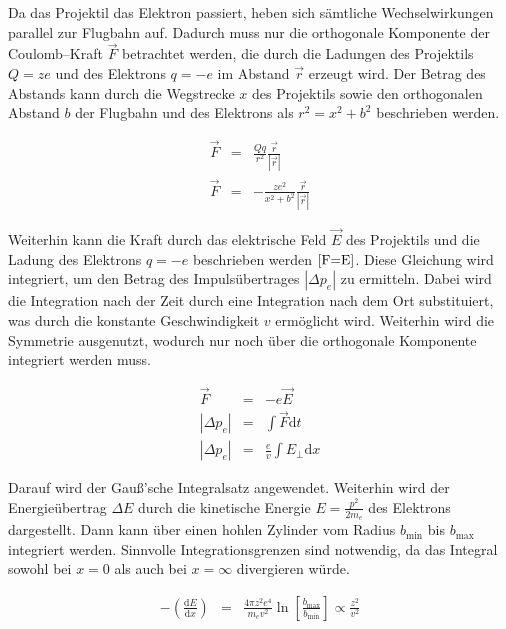\documentclass[12pt,a4paper]{scrartcl}
\numberwithin{equation}{section} %
\begin{document}
Da das Projektil das Elektron passiert, heben sich sämtliche Wechselwirkungen parallel zur Flugbahn auf. Dadurch muss nur die orthogonale Komponente der Coulomb--Kraft $\vec F$ betrachtet werden, die durch die Ladungen des Projektils $Q=ze$ und des Elektrons $q=-e$ im Abstand $\vec r$ erzeugt wird. Der Betrag des Abstands kann durch die Wegstrecke $x$ des Projektils sowie den orthogonalen Abstand $b$ der Flugbahn und des Elektrons als $r^2=x^2+b^2$ beschrieben werden.

\begin{eqnarray}
    \vec F &=& \frac{Qq}{r^2} \frac{\vec{r}}{\left|\vec r\right|} \\
    \vec F &=& -\frac{ze^2}{x^2+b^2} \frac{\vec{r}}{\left|\vec r\right|}
\end{eqnarray}

\noindent
Weiterhin kann die Kraft durch das elektrische Feld $\vec E$ des Projektils und die Ladung des Elektrons $q=-e$ beschrieben werden $\eqref{F=E}$. Diese Gleichung wird integriert, um den Betrag des Impulsübertrages $\left|\Delta p_e\right|$ zu ermitteln. Dabei wird die Integration nach der Zeit durch eine Integration nach dem Ort substituiert, was durch die konstante Geschwindigkeit $v$ ermöglicht wird. Weiterhin wird die Symmetrie ausgenutzt, wodurch nur noch über die orthogonale Komponente integriert werden muss.

\begin{eqnarray}
    \vec F &=& -e \vec E \label{F=E} \\
    \left|\Delta p_e\right| &=& \int \vec F \mathrm dt \\
    \left|\Delta p_e\right| &=& \frac{e}{v} \int E_\perp \mathrm dx
\end{eqnarray}

\noindent
Darauf wird der Gauß'sche Integralsatz angewendet. Weiterhin wird der Energieübertrag $\Delta E$ durch die kinetische Energie $E=\frac{p^2}{2m_e}$ des Elektrons dargestellt. Dann kann über einen hohlen Zylinder vom Radius $b_\mathrm{min}$ bis $b_\mathrm{max}$ integriert werden. Sinnvolle Integrationsgrenzen sind notwendig, da das Integral sowohl bei $x=0$ als auch bei $x=\infty$ divergieren würde.

\begin{eqnarray}
    -\left(\frac{\mathrm dE}{\mathrm dx}\right)
        &=& \frac{4\pi z^2 e^4}{m_ev^2}
            \ln\left[\frac{b_\mathrm{max}}{b_\mathrm{min}}\right]
            \propto \frac{z^2}{v^2}
\end{eqnarray}
\end{document}

